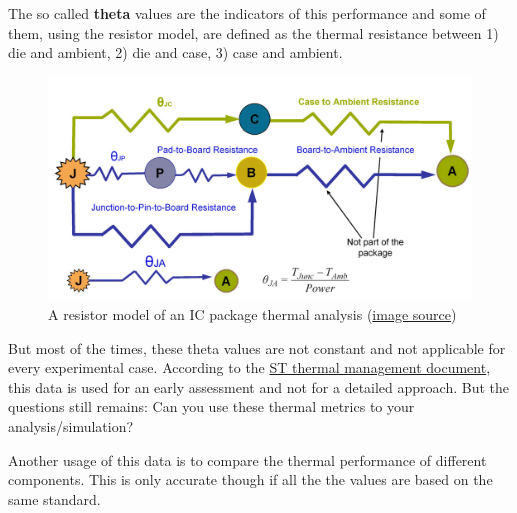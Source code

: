 \documentclass[final]{cubedoc}
\begin{document}
	The so called \textbf{theta} values are the indicators of this performance and some of them, using the resistor model, are defined as the thermal resistance between 1) die and ambient, 2) die and case, 3) case and ambient.
	
	\begin{figure}[h!]
		\centering
		\includegraphics[keepaspectratio, width=\textwidth, height=.25\textheight]{docs/resistor_model.png}
		\caption{A resistor model of an IC package thermal analysis \small{(\href{https://web.archive.org/web/20200818173736/https://www.edn.com/ensuring-the-thermal-integrity-of-your-ic-package-pc-board-design/}{image source})}} 
		\label{fig:my_label}
	\end{figure}
	
	But most of the times, these theta values are not constant and not applicable for every experimental case. According to the \href{https://web.archive.org/web/20200818184640/https://www.st.com/resource/en/application_note/dm00395696-thermal-management-guidelines-for-stm32-applications-stmicroelectronics.pdf}{ST thermal management document}, this data is used for an early assessment and not for a detailed approach. But the questions still remains: Can you use these thermal metrics to your analysis/simulation?
	
	Another usage of this data is to compare the thermal performance of different components. This is only accurate though if all the the values are based on the same standard.
	
	
\end{document}
